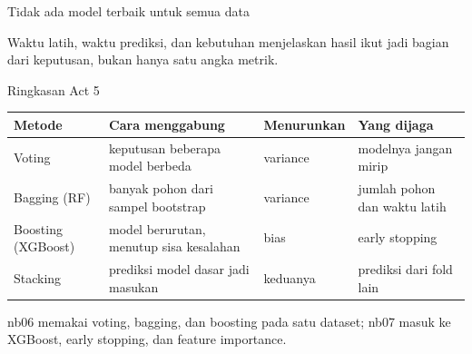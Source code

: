 \documentclass[aspectratio=169,t]{beamer}
\begin{document}
\begin{frame}{Tidak ada model terbaik untuk semua data}
  \vspace{0.5em}
  \begin{center}
  \end{center}
  \vspace{0.7em}
  {\footnotesize\color{nvgray}Waktu latih, waktu prediksi, dan kebutuhan menjelaskan hasil ikut
  jadi bagian dari keputusan, bukan hanya satu angka metrik.}
\end{frame}

\begin{frame}{Ringkasan Act 5}
  \vspace{0.4em}
  \begin{center}
  {\footnotesize\renewcommand{\arraystretch}{1.2}
  \begin{tabular}{@{}>{\raggedright\arraybackslash}p{2.5cm}>{\raggedright\arraybackslash}p{3.7cm}>{\raggedright\arraybackslash}p{2.0cm}>{\raggedright\arraybackslash}p{2.8cm}@{}}
    \toprule
    \rowcolor{nvcard}\color{nvgreen}\textbf{Metode} &
    \color{nvgreen}\textbf{Cara menggabung} &
    \color{nvgreen}\textbf{Menurunkan} &
    \color{nvgreen}\textbf{Yang dijaga} \\
    \midrule
    Voting & keputusan beberapa model berbeda & variance & modelnya jangan mirip \\
    \rowcolor{nvcard!60!nvbg} Bagging (RF) & banyak pohon dari sampel bootstrap & variance & jumlah pohon dan waktu latih \\
    Boosting (XGBoost) & model berurutan, menutup sisa kesalahan & bias & early stopping \\
    \rowcolor{nvcard!60!nvbg} Stacking & prediksi model dasar jadi masukan & keduanya & prediksi dari fold lain \\
    \bottomrule
  \end{tabular}}
  \end{center}
  \vspace{0.6em}
  {\footnotesize\color{nvgray}nb06 memakai voting, bagging, dan boosting pada satu dataset;
  nb07 masuk ke XGBoost, early stopping, dan feature importance.}
\end{frame}
\end{document}
